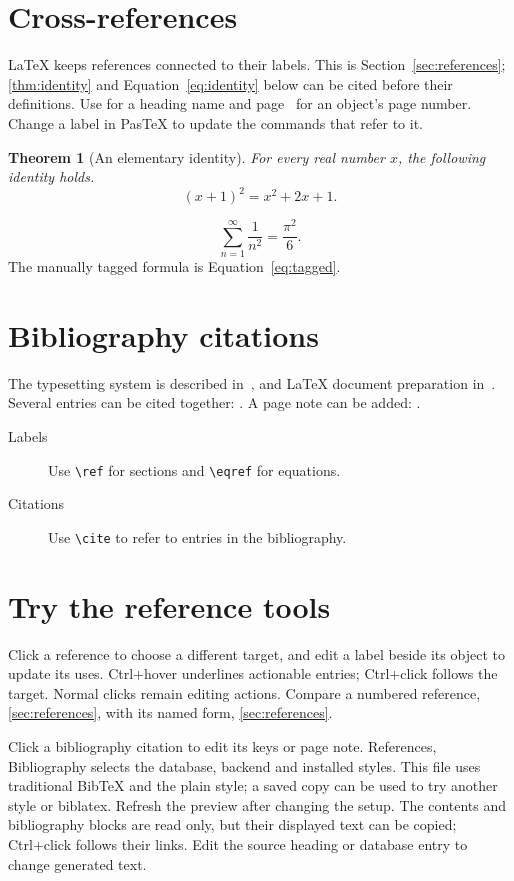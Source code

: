 \documentclass{article}
\newtheorem{theorem}{Theorem}[section]
\begin{document}
\tableofcontents
\section{Cross-references\label{sec:references}}

\LaTeX{} keeps references connected to their labels. This is
Section~\ref{sec:references}; \autoref{thm:identity} and
Equation~\eqref{eq:identity} below can be cited before their definitions.
Use  for a heading name and
page~\pageref{eq:identity} for an object's page number.
Change a label in PasTeX to update the commands that refer to it.

\begin{theorem}[An elementary identity]\label{thm:identity}
For every real number $x$, the following identity holds.
\begin{equation}\label{eq:identity}
(x+1)^2=x^2+2x+1.
\end{equation}
\end{theorem}

\begin{equation}\tag{A}\label{eq:tagged}
\sum_{n=1}^{\infty}\frac{1}{n^2}=\frac{\pi^2}{6}.
\end{equation}
The manually tagged formula is Equation~\eqref{eq:tagged}.

\section{Bibliography citations}
The typesetting system is described in~\cite{knuth1984}, and
\LaTeX{} document preparation in~\cite{lamport1994}.
Several entries can be cited together: \cite{knuth1984,lamport1994}.
A page note can be added: \cite[Chapter~2]{lamport1994}.

\begin{description}
\item[Labels] Use \verb|\ref| for sections and \verb|\eqref| for equations.
\item[Citations] Use \verb|\cite| to refer to entries in the bibliography.
\end{description}

\section{Try the reference tools}
Click a reference to choose a different target, and edit a label beside its
object to update its uses. Ctrl+hover underlines actionable entries; Ctrl+click
follows the target. Normal clicks remain editing actions. Compare a numbered
reference, \ref{sec:references}, with its named form, \autoref{sec:references}.

Click a bibliography citation to edit its keys or page note. References,
Bibliography selects the database, backend and installed styles. This file uses
traditional BibTeX and the plain style; a saved copy can be used to try another
style or biblatex. Refresh the preview after changing the setup. The contents
and bibliography blocks are read only, but their displayed text can be copied;
Ctrl+click follows their links. Edit the source heading or database entry to
change generated text.



\end{document}
